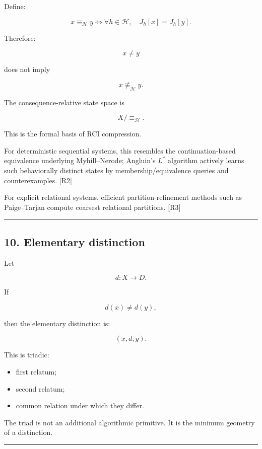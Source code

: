 \documentclass[
]{article}
\providecommand{\tightlist}{%
  \setlength{\itemsep}{0pt}\setlength{\parskip}{0pt}}
\begin{document}
Define:

\[
\boxed{
x\equiv_{\mathcal H}y
\iff
\forall h\in\mathcal H,
\quad
J_h[x]=J_h[y].
}
\]

Therefore:

\[
x\neq y
\]

does not imply

\[
x\not\equiv_{\mathcal H}y.
\]

The consequence-relative state space is

\[
\boxed{
X/{\equiv_{\mathcal H}}.
}
\]

This is the formal basis of RCI compression.

For deterministic sequential systems, this resembles the
continuation-based equivalence underlying Myhill--Nerode; Angluin's
\(L^*\) algorithm actively learns such behaviorally distinct states by
membership/equivalence queries and counterexamples. {[}R2{]}

For explicit relational systems, efficient partition-refinement methods
such as Paige--Tarjan compute coarsest relational partitions. {[}R3{]}

\begin{center}\rule{0.5\linewidth}{0.5pt}\end{center}

\subsection{10. Elementary distinction}\label{elementary-distinction}

Let

\[
d:X\to D.
\]

If

\[
d(x)\neq d(y),
\]

then the elementary distinction is:

\[
\boxed{
(x,d,y).
}
\]

This is triadic:

\begin{itemize}
\tightlist
\item
  first relatum;
\item
  second relatum;
\item
  common relation under which they differ.
\end{itemize}

The triad is not an additional algorithmic primitive. It is the minimum
geometry of a distinction.

\begin{center}\rule{0.5\linewidth}{0.5pt}\end{center}
\end{document}
